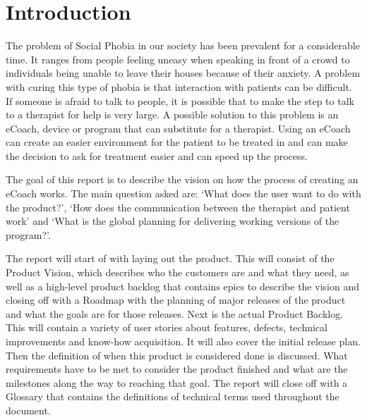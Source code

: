 \chapter{Introduction}

The problem of Social Phobia in our society has been prevalent for a considerable time. It ranges from people feeling uneasy when speaking in front of a crowd to individuals being unable to leave their houses because of their anxiety. 
A problem with curing this type of phobia is that interaction with patients can be difficult. If someone is afraid to talk to people, it is possible that to make the step to talk to a therapist for help is very large. A possible solution to this problem is an eCoach, device or program that can substitute for a therapist. Using an eCoach can create an easier environment for the patient to be treated in and can make the decision to ask for treatment easier and can speed up the process.

The goal of this report is to describe the vision on how the process of creating an eCoach works. The main question asked are: ‘What does the user want to do with the product?’, ‘How does the communication between the therapist and patient work’ and ‘What is the global planning for delivering working versions of the program?’.

The report will start of with laying out the product. This will consist of the Product Vision, which describes who the customers are and what they need, as well as a high-level product backlog that contains epics to describe the vision and closing off with a Roadmap with the planning of major releases of the product and what the goals are for those releases.
Next is the actual Product Backlog. This will contain a variety of user stories about features, defects, technical improvements and know-how acquisition. It will also cover the initial release plan.
Then the definition of when this product is considered done is discussed. What requirements have to be met to consider the product finished and what are the milestones along the way to reaching that goal.
The report will close off with a Glossary that contains the definitions of technical terms used throughout the document.